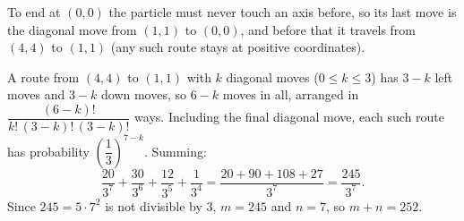 To end at $(0,0)$ the particle must never touch an axis before, so its last move is the diagonal move from $(1,1)$ to $(0,0)$, and before that it travels from $(4,4)$ to $(1,1)$ (any such route stays at positive coordinates).

A route from $(4,4)$ to $(1,1)$ with $k$ diagonal moves ($0\le k\le3$) has $3-k$ left moves and $3-k$ down moves, so $6-k$ moves in all, arranged in $\dfrac{(6-k)!}{k!\,(3-k)!\,(3-k)!}$ ways. Including the final diagonal move, each such route has probability $\left(\dfrac{1}{3}\right)^{7-k}$. Summing:
\[
\dfrac{20}{3^7}+\dfrac{30}{3^6}+\dfrac{12}{3^5}+\dfrac{1}{3^4}=\dfrac{20+90+108+27}{3^7}=\dfrac{245}{3^7}.
\]
Since $245=5\cdot7^2$ is not divisible by $3$, $m=245$ and $n=7$, so $m+n=\boxed{252}$.
